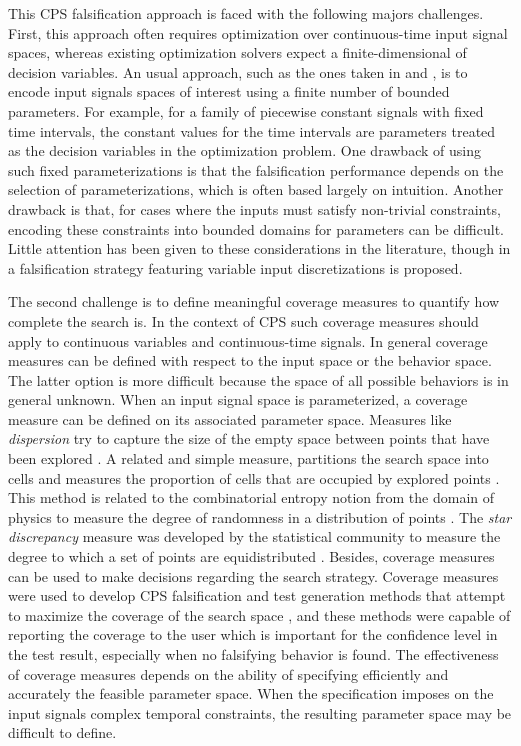 This CPS falsification approach is faced with the following majors
challenges.  First, this approach often requires optimization over
continuous-time input signal spaces, whereas existing optimization
solvers expect a finite-dimensional of decision variables.  An usual
approach, such as the ones taken in \cite{BreachCAV10} and
\cite{Nghiem10}, is to encode input signals spaces of interest using a
finite number of bounded parameters. For example, for a family of
piecewise constant signals with fixed time intervals, the constant
values for the time intervals are parameters treated as the decision
variables in the optimization problem. One drawback of using such
fixed parameterizations is that the falsification performance depends
on the selection of parameterizations, which is often based largely on
intuition. Another drawback is that, for cases where the inputs must
satisfy non-trivial constraints, encoding these constraints into
bounded domains for parameters can be difficult. Little attention has
been given to these considerations in the literature, though in
\cite{DBLP:conf/atva/DeshmukhJKM15} a falsification strategy featuring
variable input discretizations is proposed.

The second challenge is to define meaningful coverage measures to
quantify how complete the search is. In the context of CPS such
coverage measures should apply to continuous variables and
continuous-time signals. In general coverage measures can be defined
with respect to the input space or the behavior space. The latter
option is more difficult because the space of all possible behaviors
is in general unknown. When an input signal space is parameterized, a
coverage measure can be defined on its associated parameter
space. Measures like \emph{dispersion} try to capture the size of the
empty space between points that have been explored
\cite{Esposito04}. A related and simple measure, partitions the search
space into cells and measures the proportion of cells that are
occupied by explored points \cite{Skruch2011}. This method is related
to the combinatorial entropy notion from the domain of physics to
measure the degree of randomness in a distribution of points
\cite{Gabbay06}. The \emph{star discrepancy} measure was developed by
the statistical community to measure the degree to which a set of
points are equidistributed \cite{Heinrich03}. Besides, coverage
measures can be used to make decisions regarding the search
strategy. Coverage measures were used to develop CPS falsification and
test generation methods that attempt to maximize the coverage of the
search space \cite{DangN09,Dreossi2015,CAV2017}, and these methods
were capable of reporting the coverage to the user which is important
for the confidence level in the test result, especially when no
falsifying behavior is found. The effectiveness of coverage measures
depends on the ability of specifying efficiently and accurately the
feasible parameter space. When the specification imposes on the input
signals complex temporal constraints, the resulting parameter space
may be difficult to define.

